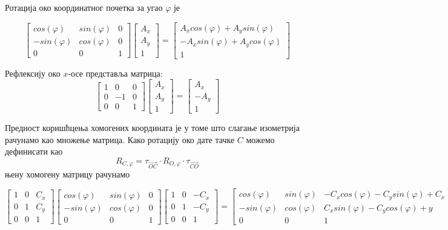 \documentclass[12pt]{report}
\begin{document}
Ротација око координатног почетка за угао $\varphi$ је

\[\begin{bmatrix}cos(\varphi) & sin(\varphi) & 0\\ -sin(\varphi) & cos(\varphi)&0 \\ 0 & 0 & 1\end{bmatrix} \begin{bmatrix}A_x\\ A_y\\1\end{bmatrix} = 
\begin{bmatrix}A_x  cos(\varphi) +  A_y  sin(\varphi)\\ -A_x  sin(\varphi) + A_y  cos(\varphi)\\1\end{bmatrix}\]

Рефлексију око $x$-осе представља матрица:
\[\begin{bmatrix}1 & 0 & 0\\ 0 & -1&0 \\ 0 & 0 & 1\end{bmatrix} \begin{bmatrix}A_x\\ A_y\\1\end{bmatrix} = 
\begin{bmatrix}A_x \\ -A_y\\1\end{bmatrix}\]

Предност  коришћцења  хомогених  координата  је  у  томе  што  слагање  изометрија  рачунамо  као множење матрица. Како ротацију око дате тачке $C$ можемо дефинисати као
$$R_{C,\varphi} = \tau_{\vec{OC}} \cdot R_{O,\varphi} \cdot \tau_{\vec{CO}}$$
њену хомогену матрицу рачунамо

\[\begin{bmatrix}1 & 0 & C_x\\ 0 & 1&C_y \\ 0 & 0 & 1\end{bmatrix}
\begin{bmatrix}cos(\varphi) & sin(\varphi) & 0\\ -sin(\varphi) & cos(\varphi)&0 \\ 0 & 0 & 1\end{bmatrix}
\begin{bmatrix}1 & 0 & -C_x\\ 0 & 1&-C_y \\ 0 & 0 & 1\end{bmatrix}
= 
\begin{bmatrix}cos(\varphi) & sin(\varphi) & -C_x cos(\varphi) - C_y sin(\varphi) + C_x\\ -sin(\varphi) & cos(\varphi)&C_x sin(\varphi) - C_y cos(\varphi) +y\\ 0 & 0 & 1\end{bmatrix}\]
\end{document}
